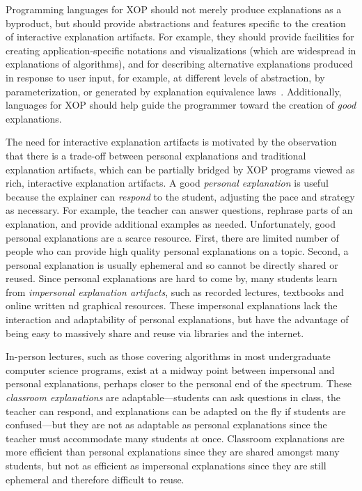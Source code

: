 \documentclass[sigconf]{acmart}
\begin{document}
Programming languages for XOP should not merely produce explanations as a
byproduct, but should provide abstractions and features specific to the
creation of interactive explanation artifacts. For example, they should provide
facilities for creating application-specific notations and visualizations
(which are widespread in explanations of algorithms), and for describing
alternative explanations produced in response to user input, for example, at
different levels of abstraction, by parameterization, or generated by
explanation equivalence laws~\cite{EW13jvlc}. Additionally, languages for XOP
should help guide the programmer toward the creation of \emph{good}
explanations.


The need for interactive explanation artifacts is motivated by the observation
that there is a trade-off between personal explanations and traditional
explanation artifacts, which can be partially bridged by XOP programs viewed as
rich, interactive explanation artifacts.
%
A good \emph{personal explanation} is useful because the explainer can
\emph{respond} to the student, adjusting the pace and strategy as necessary.
For example, the teacher can answer questions, rephrase parts of an
explanation, and provide additional examples as needed.
%
Unfortunately, good personal explanations are a scarce resource. First, there
are limited number of people who can provide high quality personal explanations
on a topic. Second, a personal explanation is usually ephemeral and so cannot
be directly shared or reused.
%
Since personal explanations are hard to come by, many students learn from
\emph{impersonal explanation artifacts}, such as recorded lectures, textbooks
and online written nd graphical resources.
%
These impersonal explanations lack the interaction and adaptability of personal
explanations, but have the advantage of being easy to massively share and reuse
via libraries and the internet.


In-person lectures, such as those covering algorithms in most undergraduate
computer science programs, exist at a midway point between impersonal and
personal explanations, perhaps closer to the personal end of the spectrum.
These \emph{classroom explanations} are adaptable---students can ask questions
in class, the teacher can respond, and explanations can be adapted on the fly
if students are confused---but they are not as adaptable as personal
explanations since the teacher must accommodate many students at once.
Classroom explanations are more efficient than personal explanations since they
are shared amongst many students, but not as efficient as impersonal
explanations since they are still ephemeral and therefore difficult to reuse.
\end{document}
